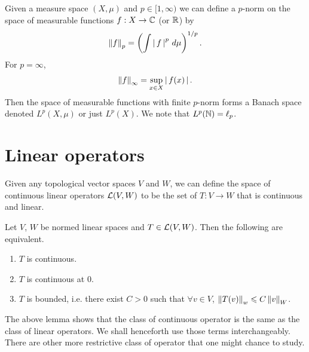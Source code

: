 \documentclass{article}
\begin{document}
\begin{mdframed}
\begin{example}[$L^p(X, \mu)$] Given a measure space $(X, \mu)$ and $p \in [1, \infty)$ we can define a $p$-norm on the space of measurable functions $f: X \to \C$ (or $\R$) by 
\begin{align*}
\norm[f]_p = \brac{\int \abs{f}^p \, d\mu }^{1/p}. 
\end{align*}
For $p = \infty$, 
\begin{align*}
\norm[f]_\infty = \sup_{x \in X} \abs{f(x)}. 
\end{align*}
Then the space of measurable functions with finite $p$-norm forms a Banach space denoted $L^p(X, \mu)$ or just $L^p(X)$.  We note that $L^p(\N) = \ell_p$. 
\end{example}
\end{mdframed} 



\section{Linear operators}
Given any topological vector spaces $V$ and $W$, we can define the space of continuous linear operators $\L(V, W)$ to be the set of $T: V \to W$ that is continuous and linear. 
\begin{flemma} Let $V$, $W$ be normed linear spaces and $T \in \L(V, W)$. Then the following are equivalent. 
\begin{enumerate}
\item $T$ is continuous. 
\item $T$ is continuous at $0$. 
\item $T$ is bounded, i.e. there exist $C > 0$ such that $\forall v \in V$, $\norm[T(v)]_w \leq C \norm[v]_W$. 
\end{enumerate}
\end{flemma}
The above lemma shows that the class of continuous operator is the same as the class of linear operators. We shall henceforth use those terms interchangeably. There are other more restrictive class of operator that one might chance to study. 
\end{document}
